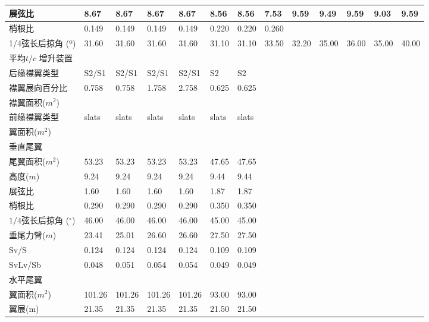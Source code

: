 \documentclass[12pt,a4paper]{report}
\begin{document}
\begin{landscape}
\begin{center}
\begin{longtable}{|p{1.5cm}|p{1.3cm}|p{1.1cm}|p{1.1cm}|p{1.1cm}|p{1.1cm}|p{1.1cm}|p{1.1cm}|p{1.1cm}|p{1.1cm}|p{1.1cm}|p{1.1cm}|p{1.1cm}|}
展弦比	&	8.67	&	8.67	&	8.67	&	8.67	&	8.56	&	8.56	&	7.53	&	9.59	&	9.49	&	9.59	&	9.03	&	9.59	\\ \hline
梢根比	&	0.149	&	0.149	&	0.149	&	0.149	&	0.220	&	0.220	&	0.260	&		&		&		&		&		\\ \hline
1/4弦长后掠角 (º)	&	31.60	&	31.60	&	31.60	&	31.60	&	31.10	&	31.10	&	33.50	&	32.20	&	35.00	&	36.00	&	35.00	&	40.00	\\ \hline
平均$t/c$ %
增升装置	&		&		&		&		&		&		&		&		&		&		&		&		\\ \hline
后缘襟翼类型	&	S2/S1	&	S2/S1	&	S2/S1	&	S2/S1	&	S2	&	S2	&		&		&		&		&		&		\\ \hline
襟翼展向百分比	&	0.758	&	0.758	&	1.758	&	2.758	&	0.625	&	0.625	&		&		&		&		&		&		\\ \hline
襟翼面积($m^2$)	&		&		&		&		&		&		&		&		&		&		&		&		\\ \hline
前缘襟翼类型	&	slats	&	slats	&	slats	&	slats	&	slats	&	slats	&		&		&		&		&		&		\\ \hline
翼面积($m^2$)	&		&		&		&		&		&		&		&		&		&		&		&		\\ \hline
垂直尾翼	&		&		&		&		&		&		&		&		&		&		&		&		\\ \hline
尾翼面积($m^2$)	&	53.23	&	53.23	&	53.23	&	53.23	&	47.65	&	47.65	&		&		&		&		&		&		\\ \hline
高度($m$)	&	9.24	&	9.24	&	9.24	&	9.24	&	9.44	&	9.44	&		&		&		&		&		&		\\ \hline
展弦比	&	1.60	&	1.60	&	1.60	&	1.60	&	1.87	&	1.87	&		&		&		&		&		&		\\ \hline
梢根比	&	0.290	&	0.290	&	0.290	&	0.290	&	0.350	&	0.350	&		&		&		&		&		&		\\ \hline
$1/4$弦长后掠角 ($^\circ$)	&	46.00	&	46.00	&	46.00	&	46.00	&	45.00	&	45.00	&		&		&		&		&		&		\\ \hline
垂尾力臂($m$)	&	23.41	&	25.01	&	26.60	&	26.60	&	27.50	&	27.50	&		&		&		&		&		&		\\ \hline
Sv/S	&	0.124	&	0.124	&	0.124	&	0.124	&	0.109	&	0.109	&		&		&		&		&		&		\\ \hline
SvLv/Sb	&	0.048	&	0.051	&	0.054	&	0.054	&	0.049	&	0.049	&		&		&		&		&		&		\\ \hline
水平尾翼	&		&		&		&		&		&		&		&		&		&		&		&		\\ \hline
翼面积($m^2$)	&	101.26	&	101.26	&	101.26	&	101.26	&	93.00	&	93.00	&		&		&		&		&		&		\\ \hline
翼展(m)	&	21.35	&	21.35	&	21.35	&	21.35	&	21.50	&	21.50	&		&		&		&		&		&		\\ \hline

\end{longtable}
\end{center}
\end{landscape}
\end{document}
